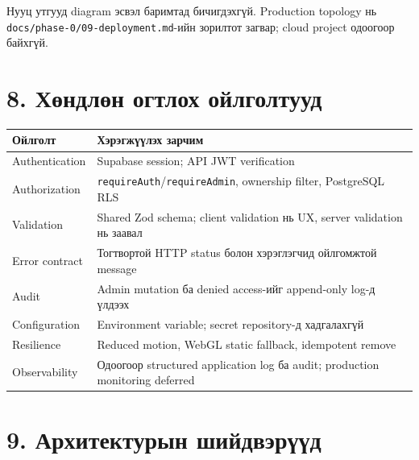 \documentclass[
  mongolian,
]{article}
\begin{document}
Нууц утгууд diagram эсвэл баримтад бичигдэхгүй. Production topology нь
\texttt{docs/phase-0/09-deployment.md}-ийн зорилтот загвар; cloud
project одоогоор байхгүй.

\section{8. Хөндлөн огтлох
ойлголтууд}\label{ux445ux4e9ux43dux434ux43bux4e9ux43d-ux43eux433ux442ux43bux43eux445-ux43eux439ux43bux433ux43eux43bux442ux443ux443ux434}

\begin{longtable}[]{@{}
  >{\raggedright\arraybackslash}p{}
  >{\raggedright\arraybackslash}p{}@{}}
\toprule\noalign{}
\begin{minipage}[b]{\linewidth}\raggedright
Ойлголт
\end{minipage} & \begin{minipage}[b]{\linewidth}\raggedright
Хэрэгжүүлэх зарчим
\end{minipage} \\
\midrule\noalign{}
\endhead
\bottomrule\noalign{}
\endlastfoot
Authentication & Supabase session; API JWT verification \\
Authorization & \texttt{requireAuth}/\texttt{requireAdmin}, ownership
filter, PostgreSQL RLS \\
Validation & Shared Zod schema; client validation нь UX, server
validation нь заавал \\
Error contract & Тогтвортой HTTP status болон хэрэглэгчид ойлгомжтой
message \\
Audit & Admin mutation ба denied access-ийг append-only log-д үлдээх \\
Configuration & Environment variable; secret repository-д хадгалахгүй \\
Resilience & Reduced motion, WebGL static fallback, idempotent remove \\
Observability & Одоогоор structured application log ба audit; production
monitoring deferred \\
\end{longtable}

\section{9. Архитектурын
шийдвэрүүд}\label{ux430ux440ux445ux438ux442ux435ux43aux442ux443ux440ux44bux43d-ux448ux438ux439ux434ux432ux44dux440ux4afux4afux434}
\end{document}
